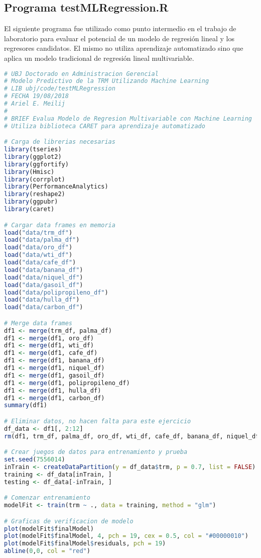 \subsection{Programa testMLRegression.R}
El siguiente programa fue utilizado como punto intermedio en el trabajo de laboratorio para evaluar el potencial de un modelo de regresión lineal y los regresores candidatos. El mismo no utiliza aprendizaje automatizado sino que aplica un modelo tradicional de regresión lineal multivariable.

\begin{lstlisting}[language=R]
# UBJ Doctorado en Administracion Gerencial
# Modelo Predictivo de la TRM Utilizando Machine Learning
# LIB ubj/code/testMLRegression
# FECHA 19/08/2018
# Ariel E. Meilij
#
# BRIEF Evalua Modelo de Regresion Multivariable con Machine Learning
# Utiliza biblioteca CARET para aprendizaje automatizado

# Carga de librerias necesarias
library(tseries)
library(ggplot2)
library(ggfortify)
library(Hmisc)
library(corrplot)
library(PerformanceAnalytics)
library(reshape2)
library(ggpubr)
library(caret)

# Cargar data frames en memoria
load("data/trm_df")
load("data/palma_df")
load("data/oro_df")
load("data/wti_df")
load("data/cafe_df")
load("data/banana_df")
load("data/niquel_df")
load("data/gasoil_df")
load("data/polipropileno_df")
load("data/hulla_df")
load("data/carbon_df")

# Merge data frames
df1 <- merge(trm_df, palma_df)
df1 <- merge(df1, oro_df)
df1 <- merge(df1, wti_df)
df1 <- merge(df1, cafe_df)
df1 <- merge(df1, banana_df)
df1 <- merge(df1, niquel_df)
df1 <- merge(df1, gasoil_df)
df1 <- merge(df1, polipropileno_df)
df1 <- merge(df1, hulla_df)
df1 <- merge(df1, carbon_df)
summary(df1)

# Eliminar datos, no hacen falta para este ejercicio
df_data <- df1[, 2:12]
rm(df1, trm_df, palma_df, oro_df, wti_df, cafe_df, banana_df, niquel_df, gasoil_df, polipropileno_df, hulla_df, carbon_df)

# Crear juegos de datos para entrenamiento y prueba
set.seed(7556014)
inTrain <- createDataPartition(y = df_data$trm, p = 0.7, list = FALSE)
training <- df_data[inTrain, ]
testing <- df_data[-inTrain, ]

# Comenzar entrenamiento
modelFit <- train(trm ~ ., data = training, method = "glm")

# Graficas de verificacion de modelo
plot(modelFit$finalModel)
plot(modelFit$finalModel, 4, pch = 19, cex = 0.5, col = "#00000010")
plot(modelFit$finalModel$residuals, pch = 19)
abline(0,0, col = "red")


\end{lstlisting}
